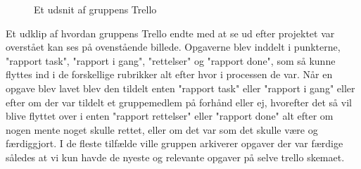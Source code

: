 \begin{figure}[H]
    \centering
    \caption{Et udsnit af gruppens Trello}
    \label{Trello}
\end{figure}

Et udklip af hvordan gruppens Trello endte med at se ud efter projektet var overstået kan ses på ovenstående billede. Opgaverne blev inddelt i punkterne, "rapport task", "rapport i gang", "rettelser" og "rapport done", som så kunne flyttes ind i de forskellige rubrikker alt efter hvor i processen de var. Når en opgave blev lavet blev den tildelt enten "rapport task" eller "rapport i gang" eller efter om der var tildelt et gruppemedlem på forhånd eller ej, hvorefter det så vil blive flyttet over i enten "rapport rettelser" eller "rapport done" alt efter om nogen mente noget skulle rettet, eller om det var som det skulle være og færdiggjort. I de fleste tilfælde ville gruppen arkiverer opgaver der var færdige således at vi kun havde de nyeste og relevante opgaver på selve trello skemaet.

